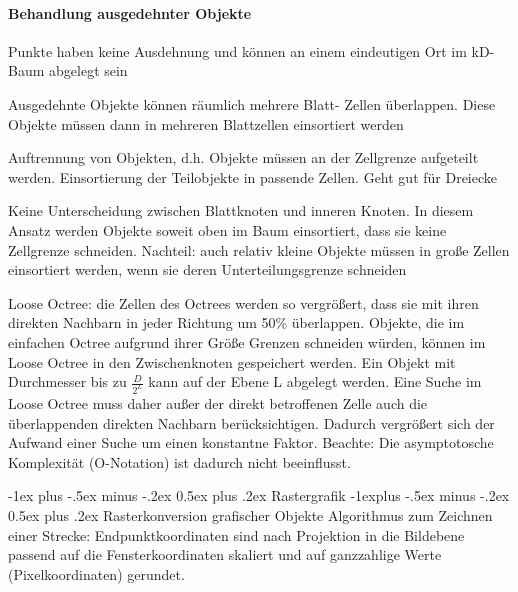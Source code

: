 \documentclass[landscape]{article}
\makeatletter
\renewcommand{\section}{\@startsection{section}{1}{0mm}%
                                {-1ex plus -.5ex minus -.2ex}%
                                {0.5ex plus .2ex}%
                                {\normalfont\large\bfseries}}
\renewcommand{\subsection}{\@startsection{subsection}{2}{0mm}%
                                {-1explus -.5ex minus -.2ex}%
                                {0.5ex plus .2ex}%
                                {\normalfont\normalsize\bfseries}}
\makeatother
\begin{document}
\begin{multicols}{3}
  \paragraph{Behandlung ausgedehnter Objekte}
  \begin{itemize*}
    \item Punkte haben keine Ausdehnung und können an einem eindeutigen Ort im kD-Baum abgelegt sein
    \item Ausgedehnte Objekte können räumlich mehrere Blatt- Zellen überlappen. Diese Objekte müssen dann in mehreren Blattzellen einsortiert werden
  \end{itemize*}
  \begin{enumerate*}
    \item Auftrennung von Objekten, d.h. Objekte müssen an der Zellgrenze aufgeteilt werden. Einsortierung der Teilobjekte in passende Zellen. Geht gut für Dreiecke
    \item Keine Unterscheidung zwischen Blattknoten und inneren Knoten. In diesem Ansatz werden Objekte soweit oben im Baum einsortiert, dass sie keine Zellgrenze schneiden. Nachteil: auch relativ kleine Objekte müssen in große Zellen einsortiert werden, wenn sie deren Unterteilungsgrenze schneiden
    \item Loose Octree: die Zellen des Octrees werden so vergrößert, dass sie mit ihren direkten Nachbarn in jeder Richtung um 50\% überlappen. Objekte, die im einfachen Octree aufgrund ihrer Größe Grenzen schneiden würden, können im Loose Octree in den Zwischenknoten gespeichert werden. Ein Objekt mit Durchmesser bis zu $\frac{D}{2^L}$ kann auf der Ebene L abgelegt werden. Eine Suche im Loose Octree muss daher außer der direkt betroffenen Zelle auch die überlappenden direkten Nachbarn berücksichtigen. Dadurch vergrößert sich der Aufwand einer Suche um einen konstantne Faktor. Beachte: Die asymptotosche Komplexität (O-Notation) ist dadurch nicht beeinflusst.
  \end{enumerate*}
  
  \section{Rastergrafik}
  \subsection{Rasterkonversion grafischer Objekte}
  Algorithmus zum Zeichnen einer Strecke: Endpunktkoordinaten sind nach Projektion in die Bildebene passend auf die Fensterkoordinaten skaliert und auf ganzzahlige Werte (Pixelkoordinaten) gerundet.
  

\end{multicols}
\end{document}
